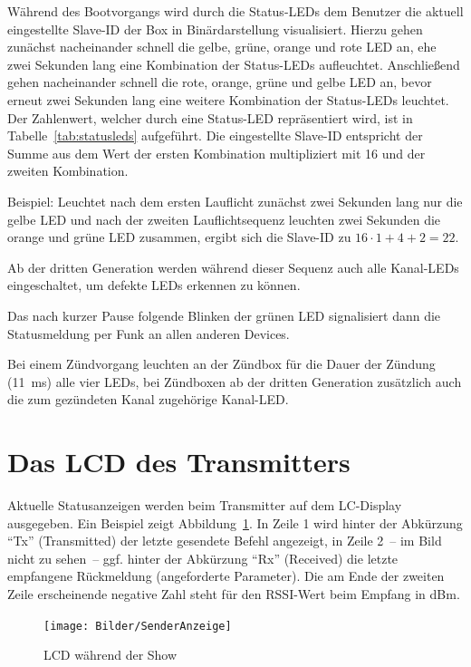 \documentclass[paper=a4, parskip, numbers=noenddot, toc=listof, headsepline]{scrbook}
\begin{document}
			Während des Bootvorgangs wird durch die Status-LEDs dem Benutzer die aktuell eingestellte Slave-ID der Box in Binärdarstellung visualisiert. Hierzu gehen zunächst nacheinander schnell die gelbe, grüne, orange und rote LED an, ehe zwei Sekunden lang eine Kombination der Status-LEDs aufleuchtet. Anschließend gehen nacheinander schnell die rote, orange, grüne und gelbe LED an, bevor erneut zwei Sekunden lang eine weitere Kombination der Status-LEDs leuchtet. Der Zahlenwert, welcher durch eine Status-LED repräsentiert wird, ist in Tabelle~\ref{tab:statusleds} aufgeführt. Die eingestellte Slave-ID entspricht der Summe aus dem Wert der ersten Kombination multipliziert mit 16 und der zweiten Kombination.
			
			Beispiel: Leuchtet nach dem ersten Lauflicht zunächst zwei Sekunden lang nur die gelbe LED und nach der zweiten Lauflichtsequenz leuchten zwei Sekunden die orange und grüne LED zusammen, ergibt sich die Slave-ID zu $16 {\cdot} 1 + 4 + 2 = 22$. 
			
			Ab der dritten Generation werden während dieser Sequenz auch alle Kanal-LEDs eingeschaltet, um defekte LEDs erkennen zu können.
			
			Das nach kurzer Pause folgende Blinken der grünen LED signalisiert dann die Statusmeldung per Funk an allen anderen Devices.

			Bei einem Zündvorgang leuchten an der Zündbox für die Dauer der Zündung (\SI{11}{\milli\second}) alle vier LEDs, bei Zündboxen ab der dritten Generation zusätzlich auch die zum gezündeten Kanal zugehörige Kanal-LED.

		\section{Das LCD des Transmitters}

			Aktuelle Statusanzeigen werden beim Transmitter auf dem LC-Display ausgegeben. Ein Beispiel zeigt Abbildung~\ref{fig:senderanzeige}. In Zeile 1 wird hinter der Abkürzung \enquote{Tx} (Transmitted) der letzte gesendete Befehl angezeigt, in Zeile 2~-- im Bild nicht zu sehen~-- ggf. hinter der Abkürzung \enquote{Rx} (Received) die letzte empfangene Rückmeldung (angeforderte Parameter). Die am Ende der zweiten Zeile erscheinende negative Zahl steht für den RSSI-Wert beim Empfang in dBm.

			\begin{figure}
				\centering
				\texttt{[image: Bilder/SenderAnzeige]}
				\caption{LCD während der Show}
				\label{fig:senderanzeige}
			\end{figure}
\end{document}
